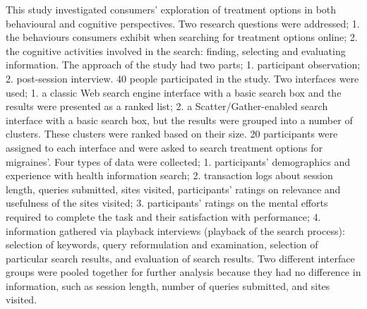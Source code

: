 \documentclass[]{article}
\begin{document}
This study investigated consumers’ exploration of treatment options in both behavioural and cognitive perspectives. Two research questions were addressed; 1. the behaviours consumers exhibit when searching for treatment options online; 2. the cognitive activities involved in the search: finding, selecting and evaluating information. The approach of the study had two parts; 1. participant observation; 2. post-session interview. 40 people participated in the study. Two interfaces were used; 1. a classic Web search engine interface with a basic search box and the results were presented as a ranked list; 2. a Scatter/Gather-enabled search interface with a basic search box, but the results were grouped into a number of clusters. These clusters were ranked based on their size. 20 participants were assigned to each interface and were asked to search treatment options for migraines’. Four types of data were collected; 1. participants’ demographics and experience with health information search; 2. transaction logs about session length, queries submitted, sites visited, participants’ ratings on relevance and usefulness of the sites visited; 3. participants’ ratings on the mental efforts required to complete the task and their satisfaction with performance; 4. information gathered via playback interviews (playback of the search process): selection of keywords, query reformulation and examination, selection of particular search results, and evaluation of search results. Two different interface groups were pooled together for further analysis because they had no difference in information, such as session length, number of queries submitted, and sites visited.                       
\end{document}
